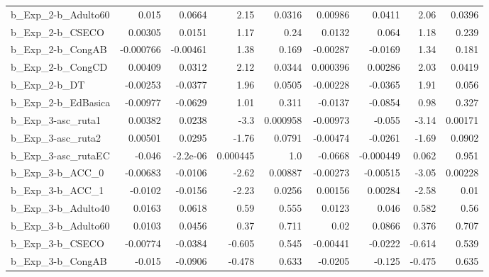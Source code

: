 \begin{tabular}{lrrrrrrrr}
b\_Exp\_2-b\_Adulto60         &       0.015 &       0.0664 &      2.15 &   0.0316 &    0.00986 &      0.0411 &         2.06 &        0.0396 \\
b\_Exp\_2-b\_CSECO            &     0.00305 &       0.0151 &      1.17 &     0.24 &     0.0132 &       0.064 &         1.18 &         0.239 \\
b\_Exp\_2-b\_CongAB           &   -0.000766 &     -0.00461 &      1.38 &    0.169 &   -0.00287 &     -0.0169 &         1.34 &         0.181 \\
b\_Exp\_2-b\_CongCD           &     0.00409 &       0.0312 &      2.12 &   0.0344 &   0.000396 &     0.00286 &         2.03 &        0.0419 \\
b\_Exp\_2-b\_DT               &    -0.00253 &      -0.0377 &      1.96 &   0.0505 &   -0.00228 &     -0.0365 &         1.91 &         0.056 \\
b\_Exp\_2-b\_EdBasica         &    -0.00977 &      -0.0629 &      1.01 &    0.311 &    -0.0137 &     -0.0854 &         0.98 &         0.327 \\
b\_Exp\_3-asc\_ruta1          &     0.00382 &       0.0238 &      -3.3 & 0.000958 &   -0.00973 &      -0.055 &        -3.14 &       0.00171 \\
b\_Exp\_3-asc\_ruta2          &     0.00501 &       0.0295 &     -1.76 &   0.0791 &   -0.00474 &     -0.0261 &        -1.69 &        0.0902 \\
b\_Exp\_3-asc\_rutaEC         &      -0.046 &     -2.2e-06 &  0.000445 &      1.0 &    -0.0668 &   -0.000449 &        0.062 &         0.951 \\
b\_Exp\_3-b\_ACC\_0            &    -0.00683 &      -0.0106 &     -2.62 &  0.00887 &   -0.00273 &    -0.00515 &        -3.05 &       0.00228 \\
b\_Exp\_3-b\_ACC\_1            &     -0.0102 &      -0.0156 &     -2.23 &   0.0256 &    0.00156 &     0.00284 &        -2.58 &          0.01 \\
b\_Exp\_3-b\_Adulto40         &      0.0163 &       0.0618 &      0.59 &    0.555 &     0.0123 &       0.046 &        0.582 &          0.56 \\
b\_Exp\_3-b\_Adulto60         &      0.0103 &       0.0456 &      0.37 &    0.711 &       0.02 &      0.0866 &        0.376 &         0.707 \\
b\_Exp\_3-b\_CSECO            &    -0.00774 &      -0.0384 &    -0.605 &    0.545 &   -0.00441 &     -0.0222 &       -0.614 &         0.539 \\
b\_Exp\_3-b\_CongAB           &      -0.015 &      -0.0906 &    -0.478 &    0.633 &    -0.0205 &      -0.125 &       -0.475 &         0.635 \\

\end{tabular}
